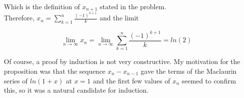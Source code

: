 \documentclass[]{article}
\begin{document}
Which is the definition of $x_{n+1}$ stated in the problem.\\

Therefore, $x_n = \displaystyle{\sum_{k=1}^{n} \frac{(-1)^{k+1}}{k}}$ and the limit 

$$\displaystyle{\lim_{n\rightarrow \infty} x_n} = \lim_{n\rightarrow \infty} \displaystyle{\sum_{k=1}^{n} \frac{(-1)^{k+1}}{k}} = ln(2)$$

Of course, a proof by induction is not very constructive. My motivation for the proposition was that the sequence ${x_n-x_{n-1}}$ gave the terms of the Maclaurin series of $ln(1+x)$ at $x = 1$ and the first few values of $x_n$ seemed to confirm this, so it was a natural candidate for induction. 
\end{document}
